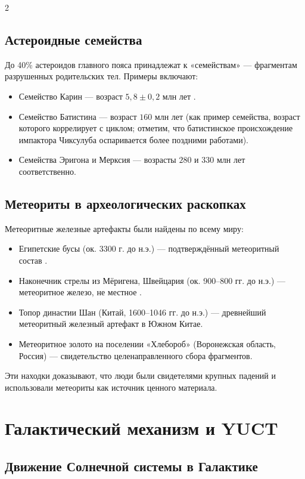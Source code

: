 \documentclass[11pt,a4paper]{article}
\begin{document}
\begin{multicols}{2}
		\subsection{Астероидные семейства}
		
		До 40\% астероидов главного пояса принадлежат к «семействам» — фрагментам разрушенных родительских тел. Примеры включают:
		\begin{itemize}
			\item Семейство Карин — возраст \(5,8 \pm 0,2\) млн лет \cite{Nesvorny2002}.
			\item Семейство Батистина — возраст \(160\) млн лет (как пример семейства, возраст которого коррелирует с циклом; отметим, что батистинское происхождение импактора Чиксулуба оспаривается более поздними работами).
			\item Семейства Эригона и Мерксия — возрасты \(280\) и \(330\) млн лет соответственно.
		\end{itemize}
		
		\subsection{Метеориты в археологических раскопках}
		
		Метеоритные железные артефакты были найдены по всему миру:
		\begin{itemize}
			\item Египетские бусы (ок. 3300 г. до н.э.) — подтверждённый метеоритный состав \cite{Rehren2013}.
			\item Наконечник стрелы из Мёригена, Швейцария (ок. 900–800 гг. до н.э.) — метеоритное железо, не местное \cite{Hofmann2023}.
			\item Топор династии Шан (Китай, 1600–1046 гг. до н.э.) — древнейший метеоритный железный артефакт в Южном Китае.
			\item Метеоритное золото на поселении «Хлебороб» (Воронежская область, Россия) — свидетельство целенаправленного сбора фрагментов.
		\end{itemize}
		Эти находки доказывают, что люди были свидетелями крупных падений и использовали метеориты как источник ценного материала.
		
		\section{Галактический механизм и YUCT}
		
		\subsection{Движение Солнечной системы в Галактике}
		

\end{multicols}
\end{document}

